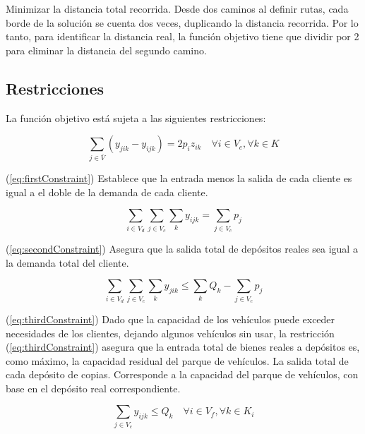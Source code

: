 \documentclass[letter, 10pt]{article}
\begin{document}
Minimizar la distancia total recorrida. Desde dos caminos al definir rutas, cada borde de la solución se cuenta dos veces, duplicando la distancia recorrida. Por lo tanto, para identificar la distancia real, la función objetivo tiene que dividir por 2 para eliminar la distancia del segundo camino.

\subsection{Restricciones}

La función objetivo está sujeta a las siguientes restricciones:

\begin{equation}
    \label{eq:firstConstraint}
    \sum_{j \in \bar{V}}{(y_{jik} - y_{ijk})} = 2p_{i}z_{ik} \quad \forall i \in V_{c}, \forall k \in K
\end{equation}

(\ref{eq:firstConstraint}) Establece que la entrada menos la salida de cada cliente es igual a el doble de la demanda de cada cliente.

\begin{equation}
    \label{eq:secondConstraint}
    \sum_{i \in V_{d}} \sum_{j \in V_{c}} \sum_{k}{y_{ijk}} = \sum_{j \in V_{c}}{p_{j}}
\end{equation}

(\ref{eq:secondConstraint}) Asegura que la salida total de depósitos reales sea igual a la demanda total del cliente.

\begin{equation}
    \label{eq:thirdConstraint}
    \sum_{i \in V_{d}} \sum_{j \in V_{c}} \sum_{k}{y_{jik}} \leq \sum_{k}{Q_{k}} - \sum_{j \in V_{c}}{p_{j}}
\end{equation}

(\ref{eq:thirdConstraint})  Dado que la capacidad de los vehículos puede exceder necesidades de los clientes, dejando algunos vehículos sin usar, la restricción  (\ref{eq:thirdConstraint}) asegura que la entrada total de bienes reales a depósitos es, como máximo, la capacidad residual del parque de vehículos. La salida total de cada depósito de copias. Corresponde a la capacidad del parque de vehículos, con base en el depósito real correspondiente.

\begin{equation}
    \label{eq:fourthConstraint}
    \sum_{j \in V_{c}}{y_{ijk}} \leq Q_{k} \quad \forall i \in V_{f}, \forall k \in K_{i}
\end{equation}
\end{document}
